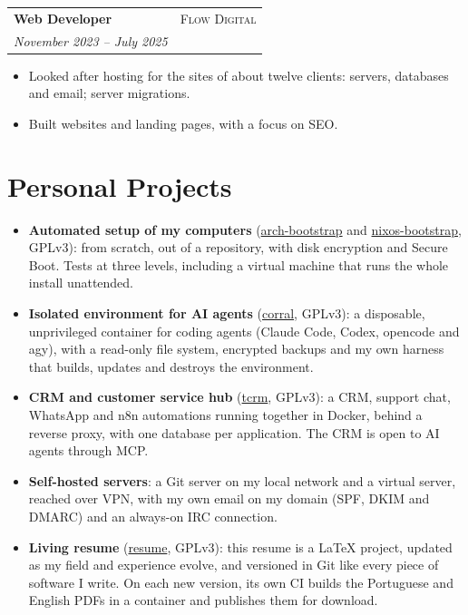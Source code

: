 \documentclass[a4paper,11pt]{article}
\makeatletter
\newcommand{\datedsubsection}[4]{%
  \vspace{0.8ex}
  \noindent\begin{tabular*}{\textwidth}{@{\extracolsep{\fill}} l r@{}}
    \textbf{#3} & \scshape{#2} \\
    \textit{#1} & \\
  \end{tabular*}\par
  \vspace{0.5ex}
  \justifying\noindent
  #4\par
}
\makeatother
\begin{document}
\datedsubsection{November 2023 -- July 2025}{Flow Digital}%
{Web Developer}{
  \begin{itemize}
    \item Looked after hosting for the sites of about twelve clients:
    servers, databases and email; server migrations.
    \item Built websites and landing pages, with a focus on SEO.
  \end{itemize}
}


\section{Personal Projects}
\begin{itemize}
  \item \textbf{Automated setup of my computers}
  (\href{https://github.com/librefos/arch-bootstrap}{arch-bootstrap} and
  \href{https://github.com/librefos/nixos-bootstrap}{nixos-bootstrap},
  GPLv3): from scratch, out of a repository, with disk encryption and Secure
  Boot.  Tests at three levels, including a virtual machine that runs the
  whole install unattended.
  \item \textbf{Isolated environment for AI agents}
  (\href{https://github.com/librefos/corral}{corral}, GPLv3): a disposable,
  unprivileged container for coding agents (Claude Code, Codex, opencode and
  agy), with a read-only file system, encrypted backups and my own harness
  that builds, updates and destroys the environment.
  \item \textbf{CRM and customer service hub}
  (\href{https://github.com/librefos/tcrm}{tcrm}, GPLv3): a CRM, support
  chat, WhatsApp and n8n automations running together in Docker, behind a
  reverse proxy, with one database per application.  The CRM is open to AI
  agents through MCP.
  \item \textbf{Self-hosted servers}: a Git server on my local network and a
  virtual server, reached over VPN, with my own email on my domain (SPF, DKIM
  and DMARC) and an always-on IRC connection.
  \item \textbf{Living resume}
  (\href{https://github.com/librefos/resume}{resume}, GPLv3): this resume is
  a \LaTeX{} project, updated as my field and experience evolve, and
  versioned in Git like every piece of software I write.  On each new
  version, its own CI builds the Portuguese and English PDFs in a container
  and publishes them for download.
\end{itemize}
\end{document}
